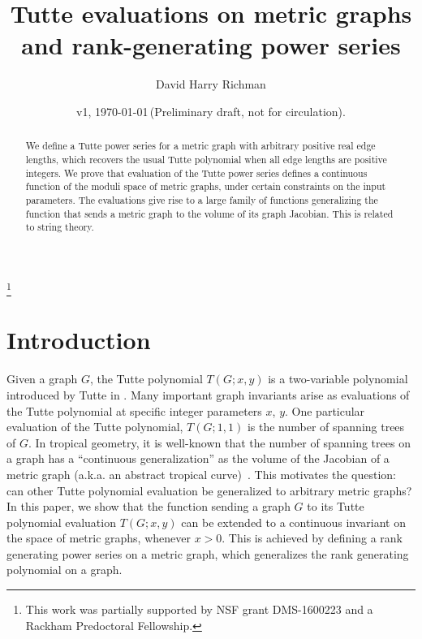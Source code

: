 \documentclass{amsart}
\theoremstyle{definition}
\begin{document}
\title
[Tutte evaluations on metric graphs]
{Tutte evaluations on metric graphs and rank-generating power series}
\author{David Harry Richman}
\date{v1, \today  \,(Preliminary draft, not for circulation).}
\thanks{This work was partially supported by NSF grant DMS-1600223
and a Rackham Predoctoral Fellowship.}


\begin{abstract}
We define a %
Tutte power series for a metric graph with arbitrary positive real edge lengths, 
which recovers the usual Tutte polynomial when all edge lengths are positive integers.
We prove that %
evaluation of the Tutte power series
defines a continuous function of the moduli space of metric graphs,
under certain constraints on the input parameters.
The evaluations give rise to a large family of functions generalizing the function that sends a metric graph to the volume of its graph Jacobian.
This is related to string theory.
\end{abstract}
\maketitle

\setcounter{tocdepth}{1}
\tableofcontents

\section{Introduction}
Given a graph $G$, the Tutte polynomial $T(G;x,y)$ is 
a two-variable polynomial %
introduced by Tutte in \cite{Tut}.
Many important graph invariants arise as evaluations of 
the Tutte polynomial %
at specific integer parameters $x$, $y$.
One particular evaluation of the Tutte polynomial, $T(G; 1, 1)$ is the number of spanning trees of $G$.
In tropical geometry, it is well-known that the number of spanning trees on a graph has a ``continuous generalization'' as the volume of the Jacobian of a metric graph (a.k.a. an abstract tropical curve)~\cites{MZ,BF,ABKS}.
This motivates the question: can other Tutte polynomial evaluation be generalized to arbitrary metric graphs?
In this paper, we show that the function sending a graph $G$ to its Tutte polynomial evaluation $T(G; x, y)$ can be extended to a continuous invariant on the space of metric graphs, whenever $x > 0$.
This is achieved by defining a rank generating power series on a metric graph,
which generalizes the rank generating polynomial on a graph.
\end{document}

